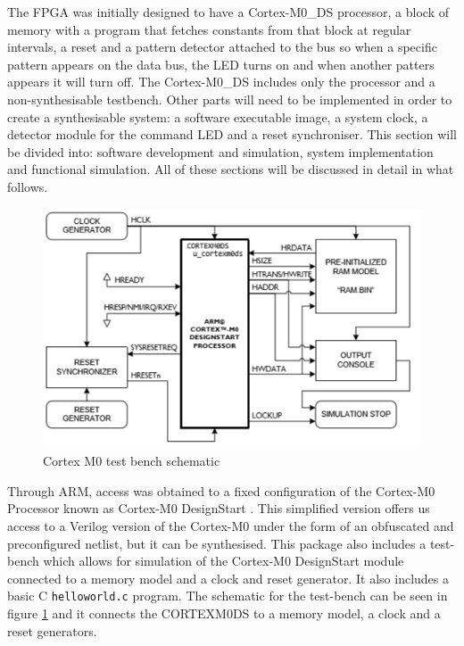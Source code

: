 
The FPGA was initially designed to have a Cortex-M0\_DS processor, a block of memory with a program that fetches constants from that block at regular intervals, a reset and a pattern detector attached to the bus so when a specific pattern appears on the data bus, the LED turns on and when another patters appears it will turn off. The Cortex-M0\_DS  includes only the processor and a non-synthesisable testbench. Other parts will need to be implemented in order to create a synthesisable system: a software executable image, a system clock, a detector module for the command LED and a reset synchroniser. This section will be divided into: software development and simulation, system implementation and functional simulation. All of these sections will be discussed in detail in what follows.

\begin{figure}
	\centering
	\includegraphics[scale=0.7]{figures/test_bench_schematic.PNG}
	\caption{Cortex M0 test bench schematic} \label{fig:test_bench}
\end{figure}

Through ARM, access was obtained to a fixed configuration of the Cortex-M0 Processor known as Cortex-M0 DesignStart \cite{armdesignstart}. This simplified version offers us access to a Verilog version of the Cortex-M0 under the form of an obfuscated and preconfigured netlist, but it can be synthesised. This package also includes a test-bench which allows for simulation of the Cortex-M0 DesignStart module connected to a memory model and a clock and reset generator. It also includes a basic C \verb|helloworld.c| program. The schematic for the test-bench can be seen in figure \ref{fig:test_bench} and it connects the CORTEXM0DS to a memory model, a clock and a reset generators.

